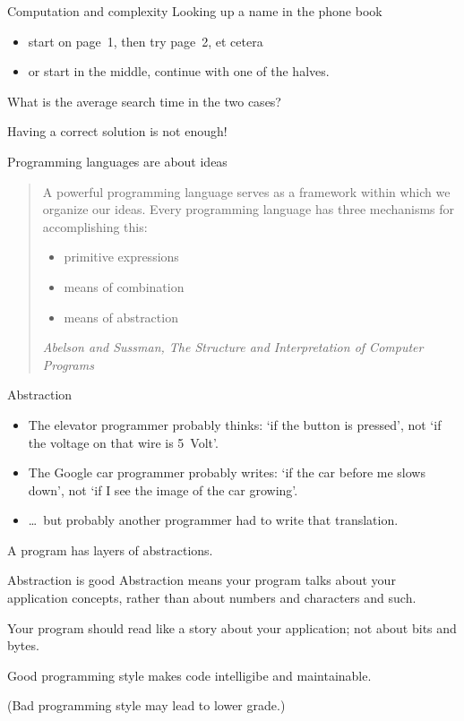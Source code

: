 \begin{block}{Computation and complexity}
  \label{sl:phonebook}
  Looking up a name in the phone book
  \begin{itemize}
  \item start on page~1, then try page~2, et cetera
  \item or start in the middle, continue with one of the halves.
  \end{itemize}
  What is the average search time in the two cases?

  Having a  correct solution is not enough!
\end{block}

\begin{block}{Programming languages are about ideas}
  \label{sl:sussman}
  \begin{quotation}
    A powerful programming language serves as a framework within which
    we organize our ideas. Every programming language has three
    mechanisms for accomplishing this:
    \begin{itemize}
    \item primitive expressions
    \item means of combination
    \item means of abstraction
    \end{itemize}
    \textsl{Abelson and Sussman, The Structure and Interpretation of
      Computer Programs}
  \end{quotation}
\end{block}

\begin{block}{Abstraction}
  \label{sl:abstraction}
  \begin{itemize}
  \item The elevator programmer probably thinks: `if the button is
    pressed', not `if the voltage on that wire is 5~Volt'.
  \item The Google car programmer probably writes: `if the car before me
    slows down', not `if I see the image of the car growing'.
  \item \ldots~but probably another programmer had to write that translation.
  \end{itemize}
  A program has layers of abstractions.
\end{block}

\begin{block}{Abstraction is good}
  \label{sl:abstraction-good}
  Abstraction means your program talks about your application
  concepts, rather than about numbers and characters and such.

  Your program should read like a story about your application; not
  about bits and bytes.

  Good programming style makes code intelligibe and maintainable.

  (Bad programming style may lead to lower grade.)
\end{block}

